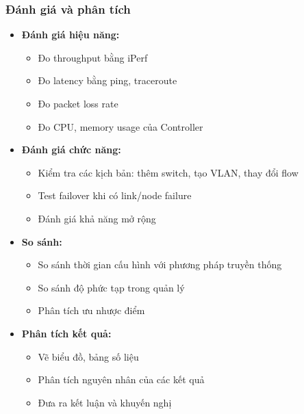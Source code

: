 \subsubsection{Đánh giá và phân tích}
\begin{itemize}
    \item \textbf{Đánh giá hiệu năng:}
    \begin{itemize}
        \item Đo throughput bằng iPerf
        \item Đo latency bằng ping, traceroute
        \item Đo packet loss rate
        \item Đo CPU, memory usage của Controller
    \end{itemize}
    \item \textbf{Đánh giá chức năng:}
    \begin{itemize}
        \item Kiểm tra các kịch bản: thêm switch, tạo VLAN, thay đổi flow
        \item Test failover khi có link/node failure
        \item Đánh giá khả năng mở rộng
    \end{itemize}
    \item \textbf{So sánh:}
    \begin{itemize}
        \item So sánh thời gian cấu hình với phương pháp truyền thống
        \item So sánh độ phức tạp trong quản lý
        \item Phân tích ưu nhược điểm
    \end{itemize}
    \item \textbf{Phân tích kết quả:}
    \begin{itemize}
        \item Vẽ biểu đồ, bảng số liệu
        \item Phân tích nguyên nhân của các kết quả
        \item Đưa ra kết luận và khuyến nghị
    \end{itemize}
\end{itemize}

